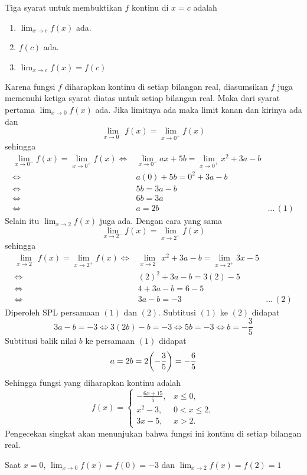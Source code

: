 \begin{enumerate}[leftmargin=*, label={\arabic*}.]
Tiga syarat untuk membuktikan $f$ kontinu di $x=c$ adalah
\begin{enumerate}[label={\arabic*}.]
    \item $\lim_{x\to c} f(x)$ ada.
    \item $f(c)$ ada.
    \item $\lim_{x\to c} f(x) = f(c)$
\end{enumerate}
Karena fungsi $f$ diharapkan kontinu di setiap bilangan real, diasumsikan $f$ 
juga memenuhi ketiga syarat diatas untuk setiap bilangan real. Maka dari syarat pertama 
$\lim_{x\to 0} f(x)$ ada. Jika limitnya ada maka limit kanan dan kirinya ada dan 
\[
\lim_{x\to 0^{-}} f(x) = \lim_{x\to 0^{+}} f(x)
\]
sehingga
\begin{align*}
    \lim_{x\to 0^{-}} f(x) = \lim_{x\to 0^{+}} f(x)
    \iff &\lim_{x\to 0^{-}} ax+5b = \lim_{x\to 0^{+}} x^{2}+3a-b\\
    \iff &a(0)+5b = 0^{2}+3a-b\\
    \iff &5b = 3a-b\\
    \iff &6b = 3a\\
    \iff &a = 2b &...\,(1)
\end{align*}
Selain itu $\lim_{x\to 2} f(x)$ juga ada. Dengan cara yang sama
\[
\lim_{x\to 2^{-}} f(x) = \lim_{x\to 2^{+}} f(x)
\]
sehingga
\begin{align*}
    \lim_{x\to 2^{-}} f(x) = \lim_{x\to 2^{+}} f(x)
    \iff &\lim_{x\to 2^{-}} x^{2}+3a-b = \lim_{x\to 2^{+}} 3x-5\\
    \iff &(2)^{2}+3a-b = 3(2)-5\\
    \iff &4+3a-b= 6-5\\
    \iff &3a-b=-3 &...\,(2)
\end{align*}
Diperoleh SPL persamaan $(1)$ dan $(2)$. Subtitusi $(1)$ ke $(2)$ didapat
\[
3a-b= -3 \iff 3(2b)-b = -3 \iff 5b = -3 \iff b = -\frac{3}{5}
\]
Subtitusi balik nilai $b$ ke persamaan $(1)$ didapat
\[
a = 2b = 2\brk*{-\frac{3}{5}} = -\frac{6}{5}
\]
Sehingga fungsi yang diharapkan kontinu adalah 
\[
    f(x)=
    \begin{cases}
        -\frac{6x+15}{5}, &x \leq 0,\\
        x^2-3, &0 < x \leq 2,\\
        3x-5, &x > 2.
    \end{cases}
\]
Pengecekan singkat akan menunjukan bahwa fungsi ini kontinu di setiap bilangan 
real.

Saat $x=0$, $\lim_{x\to 0} f(x) = f(0)=-3$ dan $\lim_{x\to 2} f(x) = f(2)=1$


\end{enumerate}
